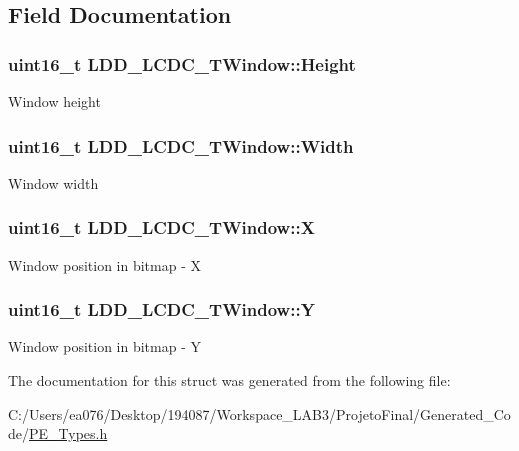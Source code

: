 \subsection{Field Documentation}
\hypertarget{struct_l_d_d___l_c_d_c___t_window_abe1dbefb6d43373336fa414b88a79cc2}{
\subsubsection[{Height}]{\setlength{\rightskip}{0pt plus 5cm}uint16\-\_\-t L\-D\-D\-\_\-\-L\-C\-D\-C\-\_\-\-T\-Window\-::\-Height}}\label{struct_l_d_d___l_c_d_c___t_window_abe1dbefb6d43373336fa414b88a79cc2}
Window height \hypertarget{struct_l_d_d___l_c_d_c___t_window_a53ee53813f5884a400be8ca3093233c4}{
\subsubsection[{Width}]{\setlength{\rightskip}{0pt plus 5cm}uint16\-\_\-t L\-D\-D\-\_\-\-L\-C\-D\-C\-\_\-\-T\-Window\-::\-Width}}\label{struct_l_d_d___l_c_d_c___t_window_a53ee53813f5884a400be8ca3093233c4}
Window width \hypertarget{struct_l_d_d___l_c_d_c___t_window_a9dd1270e9794b4dbd79b2b30afca87c9}{
\subsubsection[{X}]{\setlength{\rightskip}{0pt plus 5cm}uint16\-\_\-t L\-D\-D\-\_\-\-L\-C\-D\-C\-\_\-\-T\-Window\-::\-X}}\label{struct_l_d_d___l_c_d_c___t_window_a9dd1270e9794b4dbd79b2b30afca87c9}
Window position in bitmap -\/ X \hypertarget{struct_l_d_d___l_c_d_c___t_window_af64f532d1fb5899c563ba40df90867d8}{
\subsubsection[{Y}]{\setlength{\rightskip}{0pt plus 5cm}uint16\-\_\-t L\-D\-D\-\_\-\-L\-C\-D\-C\-\_\-\-T\-Window\-::\-Y}}\label{struct_l_d_d___l_c_d_c___t_window_af64f532d1fb5899c563ba40df90867d8}
Window position in bitmap -\/ Y 

The documentation for this struct was generated from the following file\-:\begin{DoxyCompactItemize}
\item 
C\-:/\-Users/ea076/\-Desktop/194087/\-Workspace\-\_\-\-L\-A\-B3/\-Projeto\-Final/\-Generated\-\_\-\-Code/\hyperlink{_p_e___types_8h}{P\-E\-\_\-\-Types.\-h}\end{DoxyCompactItemize}

